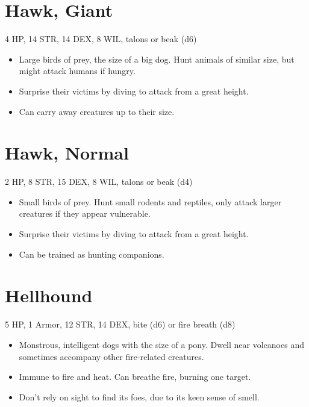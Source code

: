 \documentclass[
  10pt,
  american,
]{article}
\begin{document}
\hypertarget{hawk-giant}{%
\section{Hawk, Giant}\label{hawk-giant}}

4 HP, 14 STR, 14 DEX, 8 WIL, talons or beak (d6)

\begin{samepage}
\begin{itemize}
\setlength\itemsep{-.5em}
\item Large birds of prey, the size of a big dog. Hunt animals of similar size, but might attack humans if hungry.
\item Surprise their victims by diving to attack from a great height.
\item Can carry away creatures up to their size.
\end{itemize}
\end{samepage}

\hypertarget{hawk-normal}{%
\section{Hawk, Normal}\label{hawk-normal}}

2 HP, 8 STR, 15 DEX, 8 WIL, talons or beak (d4)

\begin{samepage}
\begin{itemize}
\setlength\itemsep{-.5em}
\item Small birds of prey. Hunt small rodents and reptiles, only attack larger creatures if they appear vulnerable.
\item Surprise their victims by diving to attack from a great height.
\item Can be trained as hunting companions.
\end{itemize}
\end{samepage}

\hypertarget{hellhound}{%
\section{Hellhound}\label{hellhound}}

5 HP, 1 Armor, 12 STR, 14 DEX, bite (d6) or fire breath (d8)

\begin{samepage}
\begin{itemize}
\setlength\itemsep{-.5em}
\item Monstrous, intelligent dogs with the size of a pony. Dwell near volcanoes and sometimes accompany other fire-related creatures.
\item Immune to fire and heat. Can breathe fire, burning one target.
\item Don't rely on sight to find its foes, due to its keen sense of smell.
\end{itemize}
\end{samepage}
\end{document}
